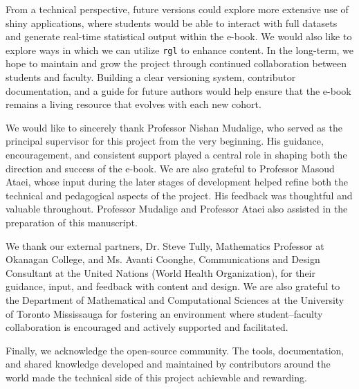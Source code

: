 \documentclass[11pt]{article}
\begin{document}
From a technical perspective, future versions could explore more extensive use of shiny applications, where students would be able to interact with full datasets and generate real-time statistical output within the e-book. 
We would also like to explore ways in which we can utilize \texttt{rgl} to enhance content.
In the long-term, we hope to maintain and grow the project through continued collaboration between students and faculty. Building a clear versioning system, contributor documentation, and a guide for future authors would help ensure that the e-book remains a living resource that evolves with each new cohort.


\begin{acknowledgments}
We would like to sincerely thank Professor Nishan Mudalige, who served as the principal supervisor for this project from the very beginning. His guidance, encouragement, and consistent support played a central role in shaping both the direction and success of the e-book.
We are also grateful to Professor Masoud Ataei, whose input during the later stages of development helped refine both the technical and pedagogical aspects of the project. His feedback was thoughtful and valuable throughout.
Professor Mudalige and Professor Ataei also assisted in the preparation of this manuscript.

We thank our external partners, Dr. Steve Tully, Mathematics Professor at Okanagan College, and Ms. Avanti Coonghe, Communications and Design Consultant at the United Nations (World Health Organization), for their guidance, input, and feedback with content and design.
We are also grateful to the Department of Mathematical and Computational Sciences at the University of Toronto Mississauga for fostering an environment where student–faculty collaboration is encouraged and actively supported and facilitated.

Finally, we acknowledge the open-source community. The tools, documentation, and shared knowledge developed and maintained by contributors around the world made the technical side of this project achievable and rewarding.
\end{acknowledgments}

\printbibliography[title={REFERENCES},heading=bibintoc]
\end{document}
